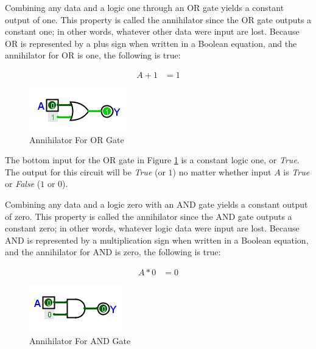 Combining any data and a logic one through an \textsf{OR} gate yields a constant output of one. This property is called the annihilator since the \textsf{OR} gate outputs a constant one; in other words, whatever other data were input are lost. Because \textsf{OR} is represented by a plus sign when written in a Boolean equation, and the annihilator for \textsf{OR} is one, the following is true:

\begin{align}
  \label{BF:eq:annihilator_or}
  A + 1 &= 1 
\end{align}

\begin{figure}[H]
	\centering
	\includegraphics[width=\maxwidth{.95\linewidth}]{gfx/04_14}
	\caption{Annihilator For OR Gate}
	\label{fig:04_14}
\end{figure}

The bottom input for the \textsf{OR}  gate in Figure \ref{fig:04_14} is a constant logic one, or \emph{True}. The output for this circuit will be \emph{True} (or $ 1 $) no matter whether input $ A $ is \emph{True} or \emph{False} ($ 1 $ or $ 0 $).

Combining any data and a logic zero with an \textsf{AND} gate yields a constant output of zero. This property is called the annihilator since the \textsf{AND}  gate outputs a constant zero; in other words, whatever logic data were input are lost. Because \textsf{AND}  is represented by a multiplication sign when written in a Boolean equation, and the annihilator for \textsf{AND} is zero, the following is true:

\begin{align}
  \label{BF:eq:annihilator_and}
  A * 0 &= 0 
\end{align}

\begin{figure}[H]
	\centering
	\includegraphics[width=\maxwidth{.95\linewidth}]{gfx/04_15}
	\caption{Annihilator For AND Gate}
	\label{fig:04_15}
\end{figure}

